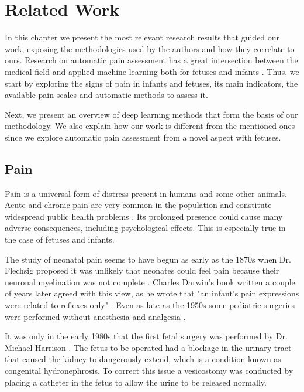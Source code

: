 \chapter{Related Work}

In this chapter we present the most relevant research results that guided our work, exposing the methodologies used by the authors and how they correlate to ours. Research on automatic pain assessment has a great intersection between the medical field and applied machine learning both for fetuses and infants \citep{ZamzmiPGKSA16, Bellieni2012}. Thus, we start by exploring the signs of pain in infants and fetuses, its main indicators, the available pain scales and automatic methods to assess it. 

Next, we present an overview of deep learning methods that form the basis of our methodology. We also explain how our work is different from the mentioned ones since we explore automatic pain assessment from a novel aspect with fetuses.

\section{Pain}

Pain is a universal form of distress present in humans and some other animals. Acute and chronic pain are very common in the population and constitute widespread public health problems \citep{Goldberg2011}. Its prolonged presence could cause many adverse consequences, including psychological effects. This is especially true in the case of fetuses and infants.

The study of neonatal pain seems to have begun as early as the 1870s when Dr. Flechsig proposed it was unlikely that neonates could feel pain because their neuronal myelination was not complete \citep{cope1998neonatal}. Charles Darwin's book written a couple of years later agreed with this view, as he wrote that "an infant's pain expressions were related to reflexes only" \citep{darwin1872expression}. Even as late as the 1950s some pediatric surgeries were performed without anesthesia and analgesia \citep{cope1998neonatal}.

It was only in the early 1980s that the first fetal surgery was performed by Dr. Michael Harrison \citep{Harrison1982}. The fetus to be operated had a blockage in the urinary tract that caused the kidney to dangerously extend, which is a condition known as congenital hydronephrosis. To correct this issue a vesicostomy was conducted by placing a catheter in the fetus to allow the urine to be released normally.


